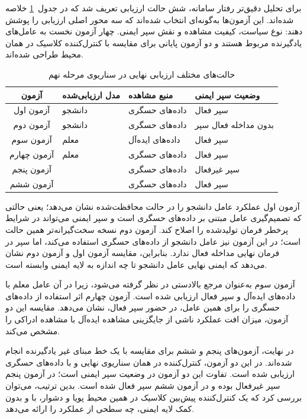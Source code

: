 برای تحلیل دقیق‌تر رفتار سامانه، شش حالت ارزیابی تعریف شد که در جدول~\ref{tab:final_eval_modes} خلاصه شده‌اند. این آزمون‌ها به‌گونه‌ای انتخاب شده‌اند که سه محور اصلی ارزیابی را پوشش دهند: نوع سیاست، کیفیت مشاهده و نقش سپر ایمنی. چهار آزمون نخست به عامل‌های یادگیرنده مربوط هستند و دو آزمون پایانی برای مقایسه با کنترل‌کننده کلاسیک  در همان محیط طراحی شده‌اند.

\begin{table}[htbp]
	\centering
	\caption{حالت‌های مختلف ارزیابی نهایی در سناریوی مرحله نهم}
	\label{tab:final_eval_modes}
	\small
	\begin{tabular}{c p{3.2cm} p{3.0cm} p{3.5cm}}
		\hline
		آزمون & مدل ارزیابی‌شده & منبع مشاهده & وضعیت سپر ایمنی \\
		\hline
		آزمون اول & دانشجو & داده‌های حسگری & سپر فعال \\
		آزمون دوم & دانشجو & داده‌های حسگری & بدون مداخله فعال سپر \\
		آزمون سوم & معلم & داده‌های ایده‌آل & سپر فعال \\
		آزمون چهارم & معلم & داده‌های حسگری & سپر فعال \\
		آزمون پنجم & \lr{MPC} & داده‌های حسگری & سپر غیرفعال \\
		آزمون ششم & \lr{MPC} & داده‌های حسگری & سپر فعال \\
		\hline
	\end{tabular}
\end{table}

آزمون اول عملکرد عامل دانشجو را در حالت محافظت‌شده نشان می‌دهد؛ یعنی حالتی که تصمیم‌گیری عامل مبتنی بر داده‌های حسگری است و سپر ایمنی می‌تواند در شرایط پرخطر فرمان تولیدشده را اصلاح کند. آزمون دوم نسخه سخت‌گیرانه‌تر همین حالت است؛ در این آزمون نیز عامل دانشجو از داده‌های حسگری استفاده می‌کند، اما سپر در فرمان نهایی مداخله فعال ندارد. بنابراین، مقایسه آزمون اول و آزمون دوم نشان می‌دهد که ایمنی نهایی عامل دانشجو تا چه اندازه به لایه ایمنی وابسته است.

آزمون سوم به‌عنوان مرجع بالادستی در نظر گرفته می‌شود، زیرا در آن عامل معلم با داده‌های ایده‌آل و سپر فعال ارزیابی شده است. آزمون چهارم اثر استفاده از داده‌های حسگری را برای همین عامل، در حضور سپر فعال، نشان می‌دهد. مقایسه این دو آزمون، میزان افت عملکرد ناشی از جایگزینی مشاهده ایده‌آل با مشاهده ادراکی را مشخص می‌کند.

در نهایت، آزمون‌های پنجم و ششم برای مقایسه با یک خط مبنای غیر یادگیرنده انجام شده‌اند. در این دو آزمون، کنترل‌کننده  در همان سناریوی نهایی و با داده‌های حسگری ارزیابی شده است. تفاوت این دو آزمون در وضعیت سپر ایمنی است؛ در آزمون پنجم سپر غیرفعال بوده و در آزمون ششم سپر فعال شده است. بدین ترتیب، می‌توان بررسی کرد که یک کنترل‌کننده پیش‌بین کلاسیک در همین محیط پویا و دشوار، با و بدون کمک لایه ایمنی، چه سطحی از عملکرد را ارائه می‌دهد.


